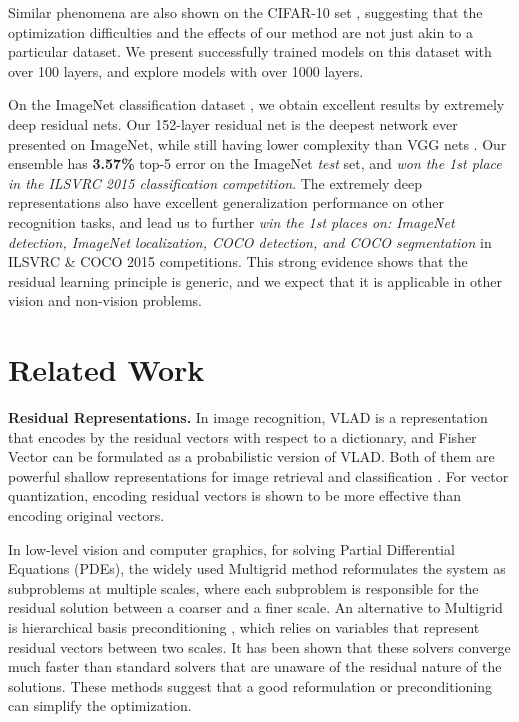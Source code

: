 \documentclass[10pt,twocolumn,letterpaper]{article}
\begin{document}
Similar phenomena are also shown on the CIFAR-10 set \cite{Krizhevsky2009}, suggesting that the optimization difficulties and the effects of our method are not just akin to a particular dataset. We present successfully trained models on this dataset with over 100 layers, and explore models with over 1000 layers.

On the ImageNet classification dataset \cite{Russakovsky2014}, we obtain excellent results by extremely deep residual nets.
Our 152-layer residual net is the deepest network ever presented on ImageNet, while still having lower complexity than VGG nets \cite{Simonyan2015}. Our ensemble has \textbf{3.57\%} top-5 error on the ImageNet \emph{test} set, and \emph{won the 1st place in the ILSVRC 2015 classification competition}. The extremely deep representations also have excellent generalization performance on other recognition tasks, and lead us to further \emph{win the 1st places on: ImageNet detection, ImageNet localization, COCO detection, and COCO segmentation} in ILSVRC \& COCO 2015 competitions. This strong evidence shows that the residual learning principle is generic, and we expect that it is applicable in other vision and non-vision problems.


\section{Related Work}

\noindent\textbf{Residual Representations.}
In image recognition, VLAD \cite{Jegou2012} is a representation that encodes by the residual vectors with respect to a dictionary, and Fisher Vector \cite{Perronnin2007} can be formulated as a probabilistic version \cite{Jegou2012} of VLAD.
Both of them are powerful shallow representations for image retrieval and classification \cite{Chatfield2011,Vedaldi2008}.
For vector quantization, encoding residual vectors \cite{Jegou2011} is shown to be more effective than encoding original vectors.

In low-level vision and computer graphics, for solving Partial Differential Equations (PDEs), the widely used Multigrid method \cite{Briggs2000} reformulates the system as subproblems at multiple scales, where each subproblem is responsible for the residual solution between a coarser and a finer scale. An alternative to Multigrid is hierarchical basis preconditioning \cite{Szeliski1990,Szeliski2006}, which relies on variables that represent residual vectors between two scales. It has been shown \cite{Briggs2000,Szeliski1990,Szeliski2006} that these solvers converge much faster than standard solvers that are unaware of the residual nature of the solutions. These methods suggest that a good reformulation or preconditioning can simplify the optimization.
\end{document}
